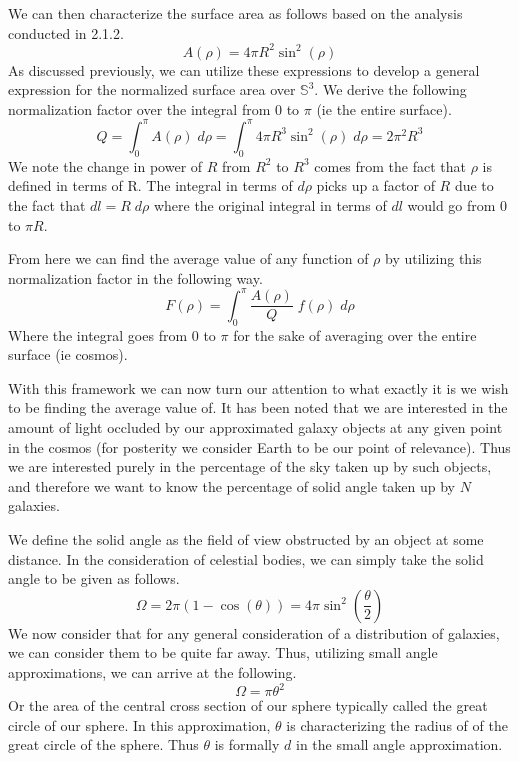 \documentclass[a4paper]{article}
\begin{document}
    We can then characterize the surface area as follows based on the analysis
    conducted in 2.1.2.
    \begin{equation}
        A(\rho) = 4 \pi R^2 \sin^2(\rho)
    \end{equation}
    As discussed previously, we can utilize these expressions to develop
    a general expression for the normalized surface area over $\mathbb{S}^3$.
    We derive the following normalization factor over the integral from $0$ to
    $\pi$ (ie the entire surface).
    \begin{equation}
        Q = \int^\pi_0 A(\rho) \;d\rho
          = \int^\pi_0 4 \pi R^3 \sin^2(\rho) \;d\rho
          = 2 \pi^2 R^3
    \end{equation}
    We note the change in power of $R$ from $R^2$ to $R^3$ comes from the fact
    that $\rho$ is defined in terms of R. The integral in terms of $d\rho$
    picks up a factor of $R$ due to the fact that $dl = R\;d\rho$ where the
    original integral in terms of $dl$ would go from $0$ to $\pi R$.
    
    From here we can find the average value of any function of $\rho$ by
    utilizing this normalization factor in the following way.
    \begin{equation}
        F(\rho) = \int_0^\pi \frac{A(\rho)}{Q} \; f(\rho) \;d\rho
    \end{equation}
    Where the integral goes from 0 to $\pi$ for the sake of averaging over the
    entire surface (ie cosmos).

    With this framework we can now turn our attention to what exactly it is we
    wish to be finding the average value of. It has been noted that we are
    interested in the amount of light occluded by our approximated galaxy
    objects at any given point in the cosmos (for posterity we consider Earth
    to be our point of relevance). Thus we are interested purely in the
    percentage of the sky taken up by such objects, and therefore we want to
    know the percentage of solid angle taken up by $N$ galaxies.

    We define the solid angle as the field of view obstructed by an object at
    some distance. In the consideration of celestial bodies, we can simply take
    the solid angle to be given as follows.
    \begin{equation*}
        \Omega = 2\pi\left(1-\cos(\theta)\right) = 4\pi\sin^2\left(\frac{\theta}{2}\right) 
    \end{equation*}
    We now consider that for any general consideration of a distribution of
    galaxies, we can consider them to be quite far away. Thus, utilizing small
    angle approximations, we can arrive at the following.
    \begin{equation}
        \Omega = \pi \theta^2
    \end{equation}
    Or the area of the central cross section of our sphere typically called the
    great circle of our sphere. In this approximation, $\theta$ is
    characterizing the radius of of the great circle of the sphere. Thus
    $\theta$ is formally $d$ in the small angle approximation.
\end{document}

